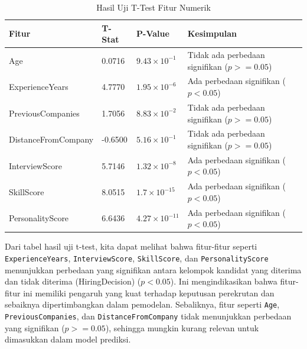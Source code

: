 \begin{table}[H]
    \centering
    \caption{Hasil Uji T-Test Fitur Numerik}
    \label{tb:t-test}
    \begin{tabular}{|l|l|l|l|}
    \hline
    \rowcolor[HTML]{EFEFEF} 
    Fitur               & T-Stat & P-Value & Kesimpulan                                                                                     \\ \hline
    Age                 & 0.0716      & $9.43 \times 10^{-1}$ & Tidak ada perbedaan signifikan (\(p >= 0.05\))                                                     \\ \hline
    ExperienceYears     & 4.7770      & $1.95 \times 10^{-6}$  & Ada perbedaan signifikan (\(p < 0.05\))                                                            \\ \hline
    PreviousCompanies   & 1.7056      & $8.83 \times 10^{-2}$  & Tidak ada perbedaan signifikan (\(p >= 0.05\))                                                     \\ \hline
    DistanceFromCompany & -0.6500     & $5.16 \times 10^{-1}$  & Tidak ada perbedaan signifikan (\(p >= 0.05\))                                                     \\ \hline
    InterviewScore      & 5.7146      & $1.32 \times 10^{-8}$  & Ada perbedaan signifikan (\(p < 0.05\))                                                            \\ \hline
    SkillScore          & 8.0515      & $1.7 \times 10^{-15}$  & Ada perbedaan signifikan (\(p < 0.05\))                                                            \\ \hline
    PersonalityScore    & 6.6436      & $4.27 \times 10^{-11}$  & Ada perbedaan signifikan (\(p < 0.05\))                                                            \\ \hline
    \end{tabular}
\end{table}

Dari tabel hasil uji t-test, kita dapat melihat bahwa fitur-fitur seperti \texttt{ExperienceYears}, \texttt{InterviewScore}, \texttt{SkillScore}, dan \texttt{PersonalityScore} menunjukkan perbedaan yang signifikan antara kelompok kandidat yang diterima dan tidak diterima (HiringDecision) (\(p < 0.05\)). Ini mengindikasikan bahwa fitur-fitur ini memiliki pengaruh yang kuat terhadap keputusan perekrutan dan sebaiknya dipertimbangkan dalam pemodelan. Sebaliknya, fitur seperti \texttt{Age}, \texttt{PreviousCompanies}, dan \texttt{DistanceFromCompany} tidak menunjukkan perbedaan yang signifikan (\(p >= 0.05\)), sehingga mungkin kurang relevan untuk dimasukkan dalam model prediksi.

